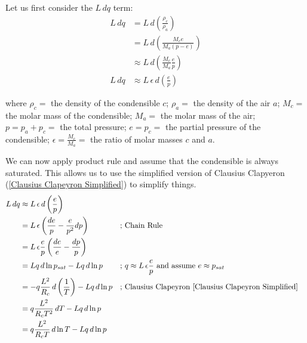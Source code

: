 Let us first consider the $L\,dq$ term:
\begin{align*}
    L\,dq&=L\, d \left( \frac{\rho_c}{\rho_a} \right)\\
        &=L\, d \left( \frac{M_c e}{M_a (p-e)} \right)\\
        &\approx L\, d \left( \frac{M_c}{M_a} \frac{e}{p} \right)\\
    L\,dq&\approx L \,\epsilon \,d \left( \frac{e}{p} \right)
\end{align*}

\noindent where $\rho_c=$ the density of the condensible $c$; $\rho_a=$ the density of the air $a$; $M_c=$ the molar mass of the condensible; $M_a=$ the molar mass of the air; $p=p_a+p_c=$ the total pressure; $e=p_c=$ the partial pressure of the condensible; $\epsilon=\frac{M_c}{M_a}= $ the ratio of molar masses $c$ and $a$.

\noindent We can now apply product rule and assume that the condensible is always saturated. This allows us to use the simplified version of Clausius Clapyeron (\ref{Clausius Clapeyron Simplified}) to simplify things.
\begin{align*}
    L\,dq &\approx L \,\epsilon \,d \left( \frac{e}{p} \right)\\
    &= L \, \epsilon \left( \frac{de}{p} - \frac{e}{p^2}dp \right)
    &\text{; }
    &\text{Chain Rule}
    \\
    &= L\,\epsilon\frac{e}{p}\left( \frac{de}{e} - \frac{dp}{p} \right)
    \\
    &=Lq\,d\ln p_{sat}-Lq\,d\ln p
    &\text{; }
    &q\approx L\,\epsilon \frac{e}{p} \text{ and assume } e\approx p_{sat}
    \\
    &=-q\frac{L^2}{R_c}\,d\left( \frac{1}{T} \right)-Lq\,d\ln p
    &\text{; }
    &\text{Clausius Clapeyron \ref{Clausius Clapeyron Simplified}}\\
    &=q\frac{L^2}{R_c T^2}\,dT-Lq\,d\ln p\\
    &=q\frac{L^2}{R_cT}\,d\ln T-Lq\,d\ln p
\end{align*}

